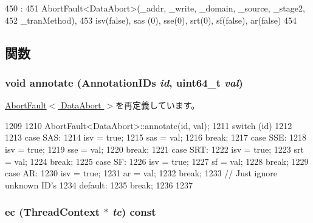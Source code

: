 \begin{DoxyCode}
450                                                                                  
               :
451         AbortFault<DataAbort>(_addr, _write, _domain, _source, _stage2,
452                               _tranMethod),
453         isv(false), sas (0), sse(0), srt(0), sf(false), ar(false)
454     {}

\end{DoxyCode}


\subsection{関数}
\hypertarget{classArmISA_1_1DataAbort_a284956f8d8ec0f18434d857ae44c6a6c}{
\subsubsection[{annotate}]{\setlength{\rightskip}{0pt plus 5cm}void annotate ({\bf AnnotationIDs} {\em id}, \/  uint64\_\-t {\em val})}}
\label{classArmISA_1_1DataAbort_a284956f8d8ec0f18434d857ae44c6a6c}


\hyperlink{classArmISA_1_1AbortFault_a1534ab135f3f8a49ad6274389bf77b51}{AbortFault$<$ DataAbort $>$}を再定義しています。


\begin{DoxyCode}
1209 {
1210     AbortFault<DataAbort>::annotate(id, val);
1211     switch (id)
1212     {
1213       case SAS:
1214         isv = true;
1215         sas = val;
1216         break;
1217       case SSE:
1218         isv = true;
1219         sse = val;
1220         break;
1221       case SRT:
1222         isv = true;
1223         srt = val;
1224         break;
1225       case SF:
1226         isv = true;
1227         sf  = val;
1228         break;
1229       case AR:
1230         isv = true;
1231         ar  = val;
1232         break;
1233       // Just ignore unknown ID's
1234       default:
1235         break;
1236     }
1237 }
\end{DoxyCode}
\hypertarget{classArmISA_1_1DataAbort_aefab73b22a74d7c48b8a23230906d7cd}{
\subsubsection[{ec}]{ ec ({\bf ThreadContext} $\ast$ {\em tc}) const}}
\label{classArmISA_1_1DataAbort_aefab73b22a74d7c48b8a23230906d7cd}


